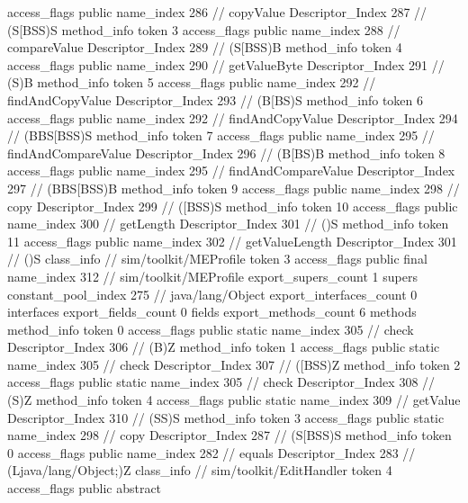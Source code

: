 {{{{{					access_flags	public
					name_index	286		// copyValue
					Descriptor_Index	287		// (S[BSS)S
				}
				method_info {
					token	3
					access_flags	public
					name_index	288		// compareValue
					Descriptor_Index	289		// (S[BSS)B
				}
				method_info {
					token	4
					access_flags	public
					name_index	290		// getValueByte
					Descriptor_Index	291		// (S)B
				}
				method_info {
					token	5
					access_flags	public
					name_index	292		// findAndCopyValue
					Descriptor_Index	293		// (B[BS)S
				}
				method_info {
					token	6
					access_flags	public
					name_index	292		// findAndCopyValue
					Descriptor_Index	294		// (BBS[BSS)S
				}
				method_info {
					token	7
					access_flags	public
					name_index	295		// findAndCompareValue
					Descriptor_Index	296		// (B[BS)B
				}
				method_info {
					token	8
					access_flags	public
					name_index	295		// findAndCompareValue
					Descriptor_Index	297		// (BBS[BSS)B
				}
				method_info {
					token	9
					access_flags	public
					name_index	298		// copy
					Descriptor_Index	299		// ([BSS)S
				}
				method_info {
					token	10
					access_flags	public
					name_index	300		// getLength
					Descriptor_Index	301		// ()S
				}
				method_info {
					token	11
					access_flags	public
					name_index	302		// getValueLength
					Descriptor_Index	301		// ()S
				}
			}
		}
		class_info {		// sim/toolkit/MEProfile
			token	3
			access_flags	public final
			name_index	312		// sim/toolkit/MEProfile
			export_supers_count	1
			supers {
				constant_pool_index	275		// java/lang/Object
			}
			export_interfaces_count	0
			interfaces {
			}
			export_fields_count	0
			fields {
			}
			export_methods_count	6
			methods {
				method_info {
					token	0
					access_flags	public static
					name_index	305		// check
					Descriptor_Index	306		// (B)Z
				}
				method_info {
					token	1
					access_flags	public static
					name_index	305		// check
					Descriptor_Index	307		// ([BSS)Z
				}
				method_info {
					token	2
					access_flags	public static
					name_index	305		// check
					Descriptor_Index	308		// (S)Z
				}
				method_info {
					token	4
					access_flags	public static
					name_index	309		// getValue
					Descriptor_Index	310		// (SS)S
				}
				method_info {
					token	3
					access_flags	public static
					name_index	298		// copy
					Descriptor_Index	287		// (S[BSS)S
				}
				method_info {
					token	0
					access_flags	public
					name_index	282		// equals
					Descriptor_Index	283		// (Ljava/lang/Object;)Z
				}
			}
		}
		class_info {		// sim/toolkit/EditHandler
			token	4
			access_flags	public abstract
}}}
